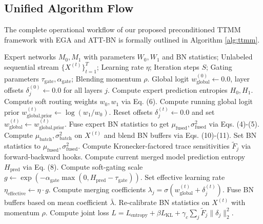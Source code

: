 \documentclass{article}
\theoremstyle{plain}
\theoremstyle{definition}
\theoremstyle{remark}
\begin{document}
\subsection{Unified Algorithm Flow}
The complete operational workflow of our proposed preconditioned TTMM framework with EGA and ATT-BN is formally outlined in Algorithm \ref{alg:ttmm}.

\begin{algorithm*}[t]
\caption{Kronecker-Preconditioned Test-Time Model Merging with EGA and ATT-BN}
\label{alg:ttmm}
\begin{algorithmic}[1]
 Expert networks $M_0, M_1$ with parameters $W_0, W_1$ and BN statistics; Unlabeled sequential stream $\{X^{(t)}\}_{t=1}^T$; Learning rate $\eta$; Iteration steps $S$; Gating parameters $\tau_{\text{gate}}, \alpha_{\text{gate}}$; Blending momentum $\rho$.
 Global logit $w_{\text{global}}^{(0)} \leftarrow 0.0$, layer offsets $\delta_j^{(0)} \leftarrow 0.0$ for all layers $j$.
    \STATE Compute expert prediction entropies $H_0, H_1$.
    \STATE Compute soft routing weights $w_0, w_1$ via Eq. (6).
    \STATE Compute running global logit prior $w_{\text{global,prior}}^{(t)} \leftarrow \log(w_1 / w_0)$.
    \STATE Reset offsets $\delta_j^{(t)} \leftarrow 0.0$ and set $w_{\text{global}}^{(t)} \leftarrow w_{\text{global,prior}}^{(t)}$.
    \STATE Fuse expert BN statistics to get $\mu_{\text{fused}}, \sigma^2_{\text{fused}}$ via Eqs. (4)-(5).
        \STATE Compute $\mu_{\text{batch}}, \sigma^2_{\text{batch}}$ on $X^{(t)}$ and blend BN buffers via Eqs. (10)-(11).
    \ELSE
        \STATE Set BN statistics to $\mu_{\text{fused}}, \sigma^2_{\text{fused}}$.
    \ENDIF
    \STATE Compute Kronecker-factored trace sensitivities $\tilde{F}_j$ via forward-backward hooks.
    \STATE Compute current merged model prediction entropy $H_{\text{pred}}$ via Eq. (8).
    \STATE Compute soft-gating scale $g \leftarrow \exp(-\alpha_{\text{gate}} \max(0, H_{\text{pred}} - \tau_{\text{gate}}))$.
    \STATE Set effective learning rate $\eta_{\text{effective}} \leftarrow \eta \cdot g$.
        \STATE Compute merging coefficients $\lambda_j = \sigma(w_{\text{global}}^{(t)} + \delta_j^{(t)})$.
        \STATE Fuse BN buffers based on mean coefficient $\bar{\lambda}$.
            \STATE Re-calibrate BN statistics on $X^{(t)}$ with momentum $\rho$.
        \ENDIF
        \STATE Compute joint loss $L = L_{\text{entropy}} + \beta L_{\text{KL}} + \gamma_c \sum_j \tilde{F}_j \|\delta_j\|_2^2$.

\end{algorithmic}
\end{algorithm*}
\end{document}
